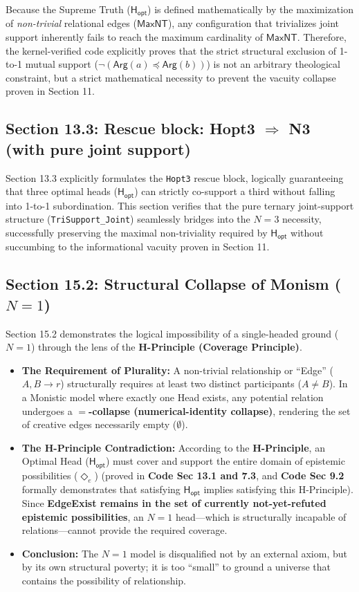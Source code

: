 \documentclass[a4paper, 11pt]{article}
\theoremstyle{plain}
\theoremstyle{definition}
\newcommand{\Arg}{\mathsf{Arg}}           %
\newcommand{\Hopt}{\mathsf{H_{opt}}}       %
\newcommand{\diamondE}{\Diamond_{e}}      %
\begin{document}
Because the Supreme Truth ($\Hopt$) is defined mathematically by the maximization of \textit{non-trivial} relational edges ($\mathsf{MaxNT}$), any configuration that trivializes joint support inherently fails to reach the maximum cardinality of $\mathsf{MaxNT}$. Therefore, the kernel-verified code explicitly proves that the strict structural exclusion of 1-to-1 mutual support ($\neg(\Arg(a) \preceq \Arg(b))$) is not an arbitrary theological constraint, but a strict mathematical necessity to prevent the vacuity collapse proven in Section 11.

\subsection{Section 13.3: Rescue block: Hopt3 $\Rightarrow$ N3 (with pure joint support)}
Section 13.3 explicitly formulates the \texttt{Hopt3} rescue block, logically guaranteeing that three optimal heads ($\Hopt$) can strictly co-support a third without falling into 1-to-1 subordination. This section verifies that the pure ternary joint-support structure (\texttt{TriSupport\_Joint}) seamlessly bridges into the $N=3$ necessity, successfully preserving the maximal non-triviality required by $\Hopt$ without succumbing to the informational vacuity proven in Section 11.

\subsection{Section 15.2: Structural Collapse of Monism ($N=1$)}
\label{sec:excludeN1}
Section 15.2 demonstrates the logical impossibility of a single-headed ground ($N=1$) through the lens of the \textbf{H-Principle (Coverage Principle)}.

\begin{itemize}
    \item \textbf{The Requirement of Plurality:} A non-trivial relationship or ``Edge'' ($A, B \to r$) structurally requires at least two distinct participants ($A \neq B$). In a Monistic model where exactly one Head exists, any potential relation undergoes a \textbf{$=$-collapse (numerical-identity collapse)}, rendering the set of creative edges necessarily empty ($\emptyset$).
    \item \textbf{The H-Principle Contradiction:} According to the \textbf{H-Principle}, an Optimal Head ($\Hopt$) must cover and support the entire domain of epistemic possibilities ($\diamondE$) (proved in \textbf{Code Sec 13.1 and 7.3}, and \textbf{Code Sec 9.2} formally demonstrates that satisfying $\Hopt$ implies satisfying this H-Principle). Since \textbf{EdgeExist remains in the set of currently not-yet-refuted epistemic possibilities}, an $N=1$ head---which is structurally incapable of relations---cannot provide the required coverage.
    \item \textbf{Conclusion:} The $N=1$ model is disqualified not by an external axiom, but by its own structural poverty; it is too ``small'' to ground a universe that contains the possibility of relationship.
\end{itemize}
\end{document}
